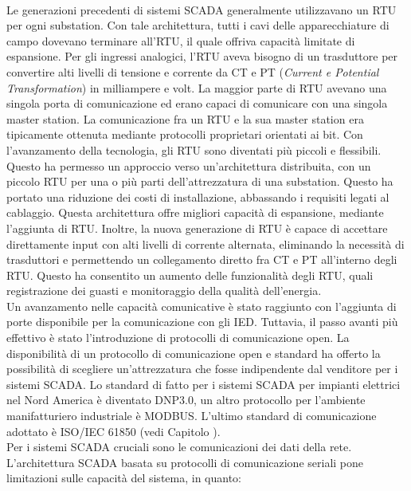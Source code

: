 \paragraph{} Le generazioni precedenti di sistemi SCADA generalmente utilizzavano un RTU per ogni substation. Con tale architettura, tutti i cavi delle apparecchiature di campo dovevano terminare all'RTU, il quale offriva capacità limitate di espansione. Per gli ingressi analogici, l'RTU aveva bisogno di un trasduttore per convertire alti livelli di tensione e corrente da CT e PT (\emph{Current e Potential Transformation}) in milliampere e volt. La maggior parte di RTU avevano una singola porta di comunicazione ed erano capaci di comunicare con una singola master station. La comunicazione fra un RTU e la sua master station era tipicamente ottenuta mediante protocolli proprietari orientati ai bit. Con l'avanzamento della tecnologia, gli RTU sono diventati più piccoli e flessibili. Questo ha permesso un approccio verso un'architettura distribuita, con un piccolo RTU per una o più parti dell'attrezzatura di una substation. Questo ha portato una riduzione dei costi di installazione, abbassando i requisiti legati al cablaggio. Questa architettura offre migliori capacità di espansione, mediante l'aggiunta di RTU. Inoltre, la nuova generazione di RTU è capace di accettare direttamente input con alti livelli di corrente alternata, eliminando la necessità di trasduttori e permettendo un collegamento diretto fra CT e PT all'interno degli RTU. Questo ha consentito un aumento delle funzionalità degli RTU, quali registrazione dei guasti e monitoraggio della qualità dell'energia.
\\
Un avanzamento nelle capacità comunicative è stato raggiunto con l'aggiunta di porte disponibile per la comunicazione con gli IED. Tuttavia, il passo avanti più effettivo è stato l'introduzione di protocolli di comunicazione open. La disponibilità di un protocollo di comunicazione open e standard ha offerto la possibilità di scegliere un'attrezzatura che fosse indipendente dal venditore per i sistemi SCADA. Lo standard di fatto per i sistemi SCADA per impianti elettrici nel Nord America è diventato DNP3.0, un altro protocollo per l'ambiente manifatturiero industriale è MODBUS. L'ultimo standard di comunicazione adottato è ISO/IEC 61850 (vedi Capitolo \label{cap:chap5}). 
\\
Per i sistemi SCADA cruciali sono le comunicazioni dei dati della rete. L'architettura SCADA basata su protocolli di comunicazione seriali pone limitazioni sulle capacità del sistema, in quanto:
